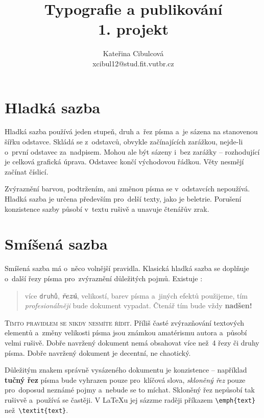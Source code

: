 \documentclass[10pt,a4paper,twocolumn]{article}
\title{Typografie a publikování \\
		\large 1. projekt}
\author{Kateřina Cibulcová \\
		xcibul12@stud.fit.vutbr.cz}
\date{}
\begin{document}
\maketitle


\section{Hladká sazba}

Hladká sazba používá jeden stupeň, druh a~řez písma a~je sázena na stanovenou šířku odstavce. Skládá se z~odstavců, obvykle začínajících zarážkou, nejde-li o~první odstavec za~nadpisem. Mohou ale být sázeny i~bez zarážky -- rozhodující je celková grafická úprava. Odstavec končí východovou řádkou. Věty nesmějí začínat číslicí.

Zvýraznění barvou, podtržením, ani změnou písma se v~odstavcích nepoužívá. Hladká sazba je určena především pro~delší texty, jako je beletrie. Porušení konzistence sazby působí v~textu rušivě a unavuje čtenářův zrak.

\section{Smíšená sazba}\label{sec:smisenasazba}

Smíšená sazba má o~něco volnější pravidla. Klasická hladká sazba se doplňuje o~další řezy písma pro~zvýraznění důležitých pojmů. Existuje :

\begin{quote} více \texttt{druhů}, {\bfseries \itshape řezů}, velikostí, barev písma \textsf{a~jiných efektů} použijeme, tím \emph{profesionálněji} bude dokument vypadat. Čtenář tím {\tiny bude} vždy {\huge \bfseries nadšen!}\end{quote}

\textsc{Tímto pravidlem se nikdy nesmíte řídit.} Příliš časté zvýrazňování textových elementů a~změny velikosti písma jsou známkou amatérismu autora a~působí velmi rušivě. Dobře navržený dokument nemá obsahovat více než~4 řezy či druhy písma. Dobře navržený dokument je decentní, ne chaotický.

Důležitým znakem správně vysázeného dokumentu je konzistence -- například \textbf{tučný řez} písma bude vyhrazen pouze pro~klíčová slova, \textit{skloněný řez} pouze pro~doposud neznámé pojmy a~nebude se to míchat. Skloněný řez nepůsobí tak rušivvě a~používá se častěji. V \LaTeX u jej sázzme raději příkazem \verb!\emph{text}! než~\verb!\textit{text}!.
\end{document}
